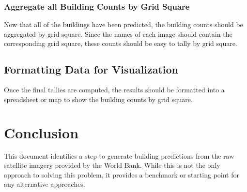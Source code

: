 \documentclass[12pt, a4paper, oneside, headinclude, footinclude]{article}
\begin{document}
\subsubsection{Aggregate all Building Counts by Grid Square}

Now that all of the buildings have been predicted, the building counts should be
aggregated by grid square. Since the names of each image should contain the
corresponding grid square, these counts should be easy to tally by grid square. 

\subsection{Formatting Data for Visualization}

Once the final tallies are computed, the results should be formatted into a spreadsheet or map to show the building counts by grid square.

\section{Conclusion}

This document identifies a step to generate building predictions from the raw
satellite imagery provided by the World Bank. While this is not the only
approach to solving this problem, it provides a benchmark or starting point for
any alternative approaches. 












\renewcommand{\refname}{\spacedlowsmallcaps{References}} 





\end{document}
